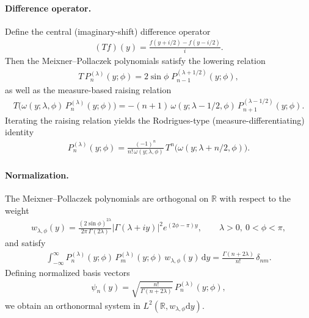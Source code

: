 \documentclass[a4paper,11pt]{article}
\numberwithin{equation}{section}
\theoremstyle{plain}
\theoremstyle{definition}
\theoremstyle{remark}
\newcommand{\1}{\ensuremath{\mathds{1}}\xspace}
\newcommand{\dd}{\ensuremath{{\textrm{d}}}\xspace}
\begin{document}
\paragraph{Difference operator.}
Define the central (imaginary-shift) difference operator
\begin{align}
(T f)(y)=\frac{f(y+i/2)-f(y-i/2)}{i}.
\end{align}
Then the Meixner--Pollaczek polynomials satisfy the lowering relation
\begin{align}
T\,P_n^{(\lambda)}(y;\phi)=2\sin\phi\;P_{n-1}^{(\lambda+1/2)}(y;\phi),
\end{align}
as well as the measure-based raising relation
\begin{align}
T\!\Big(\omega(y;\lambda,\phi)\,P_n^{(\lambda)}(y;\phi)\Big)
=-(n+1)\,\omega(y;\lambda-1/2,\phi)\,P_{n+1}^{(\lambda-1/2)}(y;\phi).
\end{align}
Iterating the raising relation yields the Rodrigues-type (measure-differentiating) identity
\begin{align}
P_n^{(\lambda)}(y;\phi)
=
\frac{(-1)^n}{n!\,\omega(y;\lambda,\phi)}\,
T^n\!\big(\omega(y;\lambda+n/2,\phi)\big).
\end{align}

\paragraph{Normalization.}
The Meixner--Pollaczek polynomials are orthogonal on $\mathbb{R}$ with respect to the weight
\begin{align}
w_{\lambda,\phi}(y)
=
\frac{(2\sin\phi)^{2\lambda}}{2\pi\,\Gamma(2\lambda)}
\left|\Gamma(\lambda+iy)\right|^2
e^{(2\phi-\pi)y},
\qquad \lambda>0,\ 0<\phi<\pi,
\end{align}
and satisfy
\begin{align}
\int_{-\infty}^{\infty}
P_n^{(\lambda)}(y;\phi)\,
P_m^{(\lambda)}(y;\phi)\,
w_{\lambda,\phi}(y)\,\dd y
=
\frac{\Gamma(n+2\lambda)}{n!}\,\delta_{nm}.
\end{align}
Defining normalized basis vectors
\begin{align}
\psi_n(y)
=
\sqrt{\frac{n!}{\Gamma(n+2\lambda)}}
\,P_n^{(\lambda)}(y;\phi),
\end{align}
we obtain an orthonormal system in $L^2(\mathbb{R},w_{\lambda,\phi}\dd y)$.
\end{document}
